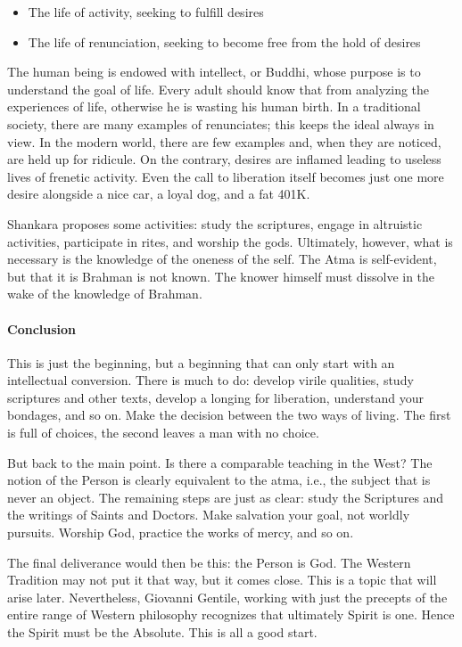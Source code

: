 \begin{itemize}


\item The life of activity, seeking to fulfill desires

\item The life of renunciation, seeking to become free from the hold of desires
\end{itemize}


The human being is endowed with intellect, or Buddhi, whose purpose is to understand the goal of life. Every adult should know that from analyzing the experiences of life, otherwise he is wasting his human birth. In a traditional society, there are many examples of renunciates; this keeps the ideal always in view. In the modern world, there are few examples and, when they are noticed, are held up for ridicule. On the contrary, desires are inflamed leading to useless lives of frenetic activity. Even the call to liberation itself becomes just one more desire alongside a nice car, a loyal dog, and a fat 401K.

Shankara proposes some activities: study the scriptures, engage in altruistic activities, participate in rites, and worship the gods. Ultimately, however, what is necessary is the knowledge of the oneness of the self. The Atma is self-evident, but that it is Brahman is not known. The knower himself must dissolve in the wake of the knowledge of Brahman.

\paragraph{Conclusion}


This is just the beginning, but a beginning that can only start with an intellectual conversion. There is much to do: develop virile qualities, study scriptures and other texts, develop a longing for liberation, understand your bondages, and so on. Make the decision between the two ways of living. The first is full of choices, the second leaves a man with no choice.

But back to the main point. Is there a comparable teaching in the West? The notion of the Person is clearly equivalent to the atma, i.e., the subject that is never an object. The remaining steps are just as clear: study the Scriptures and the writings of Saints and Doctors. Make salvation your goal, not worldly pursuits. Worship God, practice the works of mercy, and so on.

The final deliverance would then be this: the Person is God. The Western Tradition may not put it that way, but it comes close. This is a topic that will arise later. Nevertheless, Giovanni Gentile, working with just the precepts of the entire range of Western philosophy recognizes that ultimately Spirit is one. Hence the Spirit must be the Absolute. This is all a good start.


